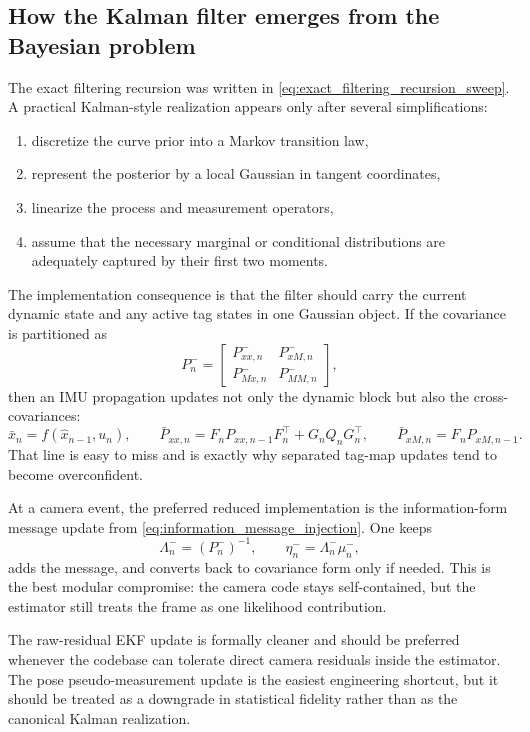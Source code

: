 \documentclass[11pt]{report}
\begin{document}
\subsection{How the Kalman filter emerges from the Bayesian problem}
The exact filtering recursion was written in \eqref{eq:exact_filtering_recursion_sweep}. A practical Kalman-style realization appears only after several simplifications:
\begin{enumerate}
    \item discretize the curve prior into a Markov transition law,
    \item represent the posterior by a local Gaussian in tangent coordinates,
    \item linearize the process and measurement operators,
    \item assume that the necessary marginal or conditional distributions are adequately captured by their first two moments.
\end{enumerate}
The implementation consequence is that the filter should carry the current dynamic state and any active tag states in one Gaussian object. If the covariance is partitioned as
\[
P_n^-=
\begin{bmatrix}
P_{xx,n}^- & P_{xM,n}^-\\
P_{Mx,n}^- & P_{MM,n}^-
\end{bmatrix},
\]
then an IMU propagation updates not only the dynamic block but also the cross-covariances:
\[
\bar x_{n}=f(\widehat x_{n-1},u_n),\qquad
\bar P_{xx,n}=F_nP_{xx,n-1}F_n^{\top}+G_nQ_nG_n^{\top},\qquad
\bar P_{xM,n}=F_nP_{xM,n-1}.
\]
That line is easy to miss and is exactly why separated tag-map updates tend to become overconfident.

At a camera event, the preferred reduced implementation is the information-form message update from \eqref{eq:information_message_injection}. One keeps
\[
\Lambda_n^-=(P_n^-)^{-1},\qquad \eta_n^-=\Lambda_n^- \mu_n^-,
\]
adds the message, and converts back to covariance form only if needed. This is the best modular compromise: the camera code stays self-contained, but the estimator still treats the frame as one likelihood contribution.

The raw-residual EKF update is formally cleaner and should be preferred whenever the codebase can tolerate direct camera residuals inside the estimator. The pose pseudo-measurement update is the easiest engineering shortcut, but it should be treated as a downgrade in statistical fidelity rather than as the canonical Kalman realization.
\end{document}

